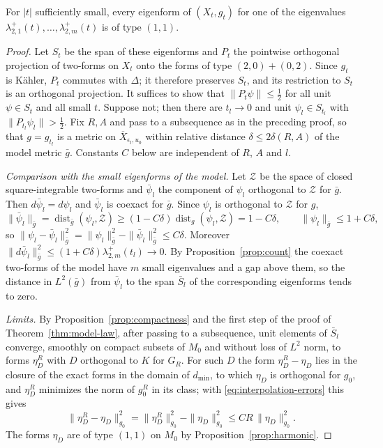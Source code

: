 \begin{proposition}\label{prop:type}
For $|t|$ sufficiently small, every eigenform of
$(X_t,g_t)$ for one of the eigenvalues
$\lambda^+_{2,1}(t),\ldots,\lambda^+_{2,m}(t)$ is of type $(1,1)$.
\end{proposition}
\begin{proof}
Let $S_t$ be the span of these eigenforms and $P_t$ the pointwise
orthogonal projection of two-forms on $X_t$ onto the forms of type
$(2,0)+(0,2)$. Since $g_t$ is K\"ahler, $P_t$ commutes with $\Delta$; it
therefore preserves $S_t$, and its restriction to $S_t$ is an orthogonal
projection. It suffices to show that $\|P_t\psi\|\le\tfrac12$ for all
unit $\psi\in S_t$ and all small $t$. Suppose not; then there are
$t_l\to0$ and unit $\psi_l\in S_{t_l}$ with $\|P_{t_l}\psi_l\|>\tfrac12$.
Fix $R,A$ and pass to a subsequence as in the preceding proof, so that
$g=g_{t_l}$ is a metric on $\overline X_{\epsilon_l,u_0}$ within relative
distance $\delta\le2\delta(R,A)$ of the model metric $\bar g$. Constants
$C$ below are independent of $R$, $A$ and $l$.

\emph{Comparison with the small eigenforms of the model.} Let
$\mathcal Z$ be the space of closed square-integrable two-forms and
$\bar\psi_l$ the component of $\psi_l$ orthogonal to $\mathcal Z$ for
$\bar g$. Then $d\bar\psi_l=d\psi_l$ and $\bar\psi_l$ is coexact for
$\bar g$. Since $\psi_l$ is orthogonal to $\mathcal Z$ for $g$,
\[
 \|\bar\psi_l\|_{\bar g}=\operatorname{dist}_{\bar g}(\psi_l,\mathcal Z)
 \ge(1-C\delta)\operatorname{dist}_{g}(\psi_l,\mathcal Z)=1-C\delta,
 \qquad\|\psi_l\|_{\bar g}\le1+C\delta,
\]
so $\|\psi_l-\bar\psi_l\|^2_{\bar g}=\|\psi_l\|^2_{\bar g}
-\|\bar\psi_l\|^2_{\bar g}\le C\delta$. Moreover
$\|d\bar\psi_l\|^2_{\bar g}\le(1+C\delta)\lambda^+_{2,m}(t_l)\to0$. By
Proposition~\ref{prop:count} the coexact two-forms of the model have $m$
small eigenvalues and a gap above them, so the distance in $L^2(\bar g)$
from $\bar\psi_l$ to the span $\bar S_l$ of the corresponding eigenforms
tends to zero.

\emph{Limits.} By Proposition~\ref{prop:compactness} and the first step
of the proof of Theorem~\ref{thm:model-law}, after passing to a
subsequence, unit elements of $\bar S_l$ converge, smoothly on compact
subsets of $M_0$ and without loss of $L^2$ norm, to forms $\eta^R_D$
with $D$ orthogonal to $K$ for $G_R$. For such $D$ the form
$\eta^R_D-\eta_D$ lies in the closure of the exact forms in the domain
of $d_{\min}$, to which $\eta_D$ is orthogonal for $g_0$, and $\eta^R_D$
minimizes the norm of $g_0^R$ in its class; with
\eqref{eq:interpolation-errors} this gives
\[
 \|\eta^R_D-\eta_D\|^2_{g_0}=\|\eta^R_D\|^2_{g_0}-\|\eta_D\|^2_{g_0}
 \le CR\,\|\eta_D\|^2_{g_0}.
\]
The forms $\eta_D$ are of type $(1,1)$ on $M_0$ by
Proposition~\ref{prop:harmonic}.


\end{proof}
